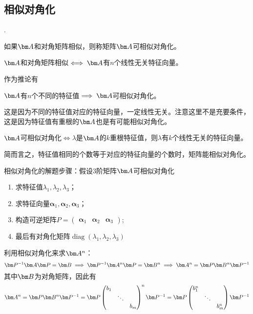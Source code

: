 \subsection{相似对角化}
.
\begin{definition}
    如果$\mat{A}$和对角矩阵相似，则称矩阵$\mat{A}$可相似对角化。
\end{definition}

\begin{theorem}
    $\mat{A}$和对角矩阵相似$\iff \mat{A}$有$n$个线性无关特征向量。
\end{theorem}
作为推论有
\begin{theorem}
    $\mat{A}$有$n$个不同的特征值$\implies \mat{A}$可相似对角化。
\end{theorem}
这是因为不同的特征值对应的特征向量，一定线性无关。注意这里不是充要条件，这是因为特征值有重根的$\mat{A}$也是有可能相似对角化。

\begin{theorem}
    $\mat{A}$可相似对角化$\iff \lambda$是$\mat{A}$的$k$重根特征值，则$\lambda$有$k$个线性无关的特征向量。
\end{theorem}
简而言之，特征值相同的个数等于对应的特征向量的个数时，矩阵能相似对角化。

相似对角化的解题步骤：假设$3$阶矩阵$\mat{A}$可相似对角化
\begin{enumerate}[(1)]
    \item 求特征值$\lambda_1, \lambda_2, \lambda_3$；
    \item 求特征向量$\bm{\alpha}_1,\bm{\alpha}_2,\bm{\alpha}_3$；
    \item 构造可逆矩阵$P=\begin{pmatrix} \bm{\alpha}_1 & \bm{\alpha}_2& \bm{\alpha}_3 \end{pmatrix}$;
    \item 最后有对角化矩阵$\operatorname{diag}(\lambda_1,\lambda_2,\lambda_3)$
\end{enumerate}

利用相似对角化来求$\mat{A}^n$：
\[
    \mat{P}^{-1}\mat{A}\mat{P} = \mat{B} \implies    \mat{P}^{-1}\mat{A}^n\mat{P} = \mat{B}^n \implies \mat{A}^n = \mat{P}\mat{B}^n\mat{P}^{-1}
\]
其中$\mat{B}$为对角矩阵，因此有
\begin{equation}
    \mat{A}^n = \mat{P}\mat{B}^n\mat{P}^{-1} =
    \mat{P}
    \begin{pmatrix}
        b_1 &        &     \\
            & \ddots &     \\
            &        & b_m
    \end{pmatrix}^n\mat{P}^{-1}
    =\mat{P}
    \begin{pmatrix}
        b_1^n &        &       \\
              & \ddots &       \\
              &        & b_m^n
    \end{pmatrix}\mat{P}^{-1}
\end{equation}

